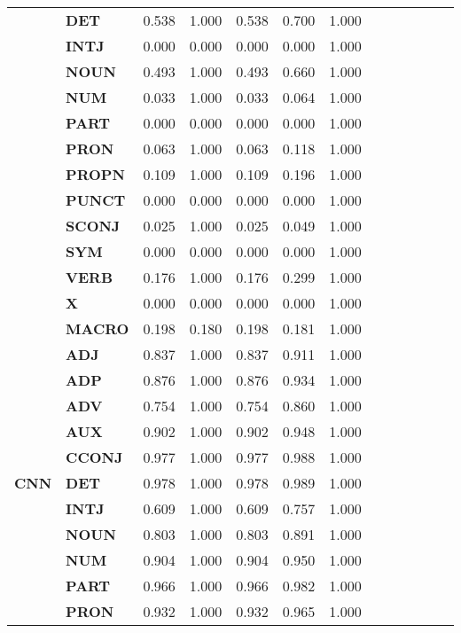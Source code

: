 \begin{longtable}{|l||l||l||l||l||l||l||l||l||l||l||l||l|}
\textbf{} & \textbf{DET} & 0.538 & 1.000 & 0.538 & 0.700 & 1.000 \\
\textbf{} & \textbf{INTJ} & 0.000 & 0.000 & 0.000 & 0.000 & 1.000 \\
\textbf{} & \textbf{NOUN} & 0.493 & 1.000 & 0.493 & 0.660 & 1.000 \\
\textbf{} & \textbf{NUM} & 0.033 & 1.000 & 0.033 & 0.064 & 1.000 \\
\textbf{} & \textbf{PART} & 0.000 & 0.000 & 0.000 & 0.000 & 1.000 \\
\textbf{} & \textbf{PRON} & 0.063 & 1.000 & 0.063 & 0.118 & 1.000 \\
\textbf{} & \textbf{PROPN} & 0.109 & 1.000 & 0.109 & 0.196 & 1.000 \\
\textbf{} & \textbf{PUNCT} & 0.000 & 0.000 & 0.000 & 0.000 & 1.000 \\
\textbf{} & \textbf{SCONJ} & 0.025 & 1.000 & 0.025 & 0.049 & 1.000 \\
\textbf{} & \textbf{SYM} & 0.000 & 0.000 & 0.000 & 0.000 & 1.000 \\
\textbf{} & \textbf{VERB} & 0.176 & 1.000 & 0.176 & 0.299 & 1.000 \\
\textbf{} & \textbf{X} & 0.000 & 0.000 & 0.000 & 0.000 & 1.000 \\
\textbf{} & \textbf{MACRO} & 0.198 & 0.180 & 0.198 & 0.181 & 1.000 \\
\cline{1-7}
\multirow[t]{18}{*}{\textbf{CNN}} & \textbf{ADJ} & 0.837 & 1.000 & 0.837 & 0.911 & 1.000 \\
\textbf{} & \textbf{ADP} & 0.876 & 1.000 & 0.876 & 0.934 & 1.000 \\
\textbf{} & \textbf{ADV} & 0.754 & 1.000 & 0.754 & 0.860 & 1.000 \\
\textbf{} & \textbf{AUX} & 0.902 & 1.000 & 0.902 & 0.948 & 1.000 \\
\textbf{} & \textbf{CCONJ} & 0.977 & 1.000 & 0.977 & 0.988 & 1.000 \\
\textbf{} & \textbf{DET} & 0.978 & 1.000 & 0.978 & 0.989 & 1.000 \\
\textbf{} & \textbf{INTJ} & 0.609 & 1.000 & 0.609 & 0.757 & 1.000 \\
\textbf{} & \textbf{NOUN} & 0.803 & 1.000 & 0.803 & 0.891 & 1.000 \\
\textbf{} & \textbf{NUM} & 0.904 & 1.000 & 0.904 & 0.950 & 1.000 \\
\textbf{} & \textbf{PART} & 0.966 & 1.000 & 0.966 & 0.982 & 1.000 \\
\textbf{} & \textbf{PRON} & 0.932 & 1.000 & 0.932 & 0.965 & 1.000 \\

\end{longtable}
